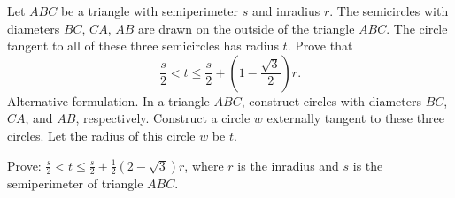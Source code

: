 \item[\textbf{G7.}]Let $ABC$ be a triangle with semiperimeter $s$ and inradius $r$. The semicircles with diameters $BC$,  $CA$,  $AB$ are drawn on the outside of the triangle $ABC$. The circle tangent to all of these three semicircles has radius $t$. Prove that\[\frac{s}{2}<t\le\frac{s}{2}+\left(1-\frac{\sqrt{3}}{2}\right)r. \]Alternative formulation. In a triangle $ABC$,  construct circles with diameters $BC$,  $CA$,  and $AB$,  respectively. Construct a circle $w$ externally tangent to these three circles. Let the radius of this circle $w$ be $t$.

Prove: $\frac{s}{2}<t\le\frac{s}{2}+\frac12\left(2-\sqrt3\right)r$,  where $r$ is the inradius and $s$ is the semiperimeter of triangle $ABC$.
